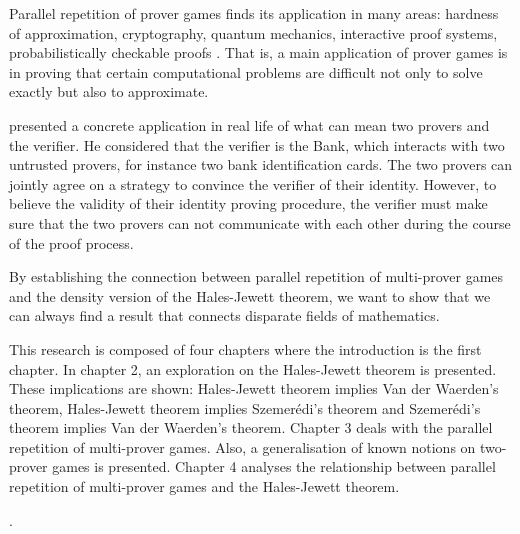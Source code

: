 Parallel repetition of prover games finds its application in many areas: hardness of approximation, cryptography, quantum mechanics, interactive proof systems, probabilistically checkable proofs  \cite{tamaki2015parallel, dinur2016multiplayer}. 
 That is, a main application of prover games is in proving that certain computational problems are difficult not only to solve exactly but also to approximate.

\citep{ben1990efficient} presented a concrete application in real life of what can mean  two provers and the verifier. He considered that the verifier is the Bank, which interacts with two untrusted provers, for instance two bank identification cards. The two provers can jointly agree on a strategy to convince the verifier of their identity. However, to believe the validity of their identity proving procedure, the verifier must make sure that the two provers can not communicate with each other during the course of the proof process. 

By establishing the connection between parallel repetition of multi-prover games and the density version of the Hales-Jewett theorem, we want to show that we can always find a result that connects disparate fields of mathematics.

This research is composed of four chapters where the introduction is the first chapter. In chapter 2, an exploration on the Hales-Jewett theorem is presented. These implications are shown:  Hales-Jewett theorem implies Van der Waerden's theorem, Hales-Jewett theorem implies Szemerédi's theorem and Szemerédi's theorem implies Van der Waerden's theorem. Chapter 3 deals with the parallel repetition of  multi-prover games. Also, a generalisation of  known notions on two-prover games is presented. Chapter 4 analyses the relationship between parallel repetition of multi-prover games and the Hales-Jewett theorem.  




%
%






. 